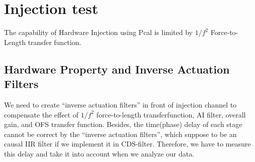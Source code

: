 \begin{center}
\end{center}
\begin{center}
\end{center}

\section{Injection test}
The capability of Hardware Injection using Pcal is limited by $1/f^2$ Force-to-Length transfer function.

\subsection{Hardware Property and Inverse Actuation Filters}
We need to create “inverse actuation filters” in front of injection channel to compensate the effect of $1/f^2$ force-to-length transferfunction, AI filter, overall gain, and OFS transfer function\cite{ligo:inj}. Besides, the time(phase) delay of each stage cannot be correct by the “inverse actuation filters”, which suppose to be an causal IIR filter if we implement it in CDS-filter. Therefore, we have to measure this delay and take it into account when we analyze our data.
